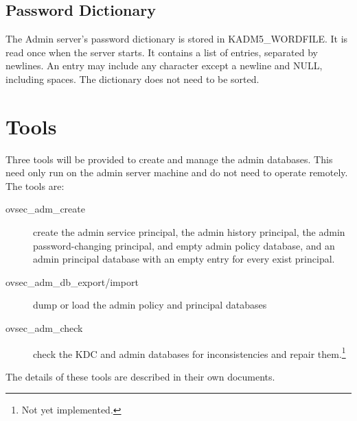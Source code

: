 \subsection{Password Dictionary}

The Admin server's password dictionary is stored in
KADM5_WORDFILE.  It is read once when the server starts.  It
contains a list of entries, separated by newlines.  An entry may
include any character except a newline and NULL, including spaces.
The dictionary does not need to be sorted.

\section{Tools}
\label{sec:tools}

Three tools will be provided to create and manage the admin databases.
This need only run on the admin server machine and do not need to
operate remotely.  The tools are:

\begin{description}
\item[ovsec_adm_create] create the admin service principal, the admin
history principal, the admin password-changing principal, and empty
admin policy database, and an admin principal database with an empty
entry for every exist principal.
\item[ovsec_adm_db_export/import] dump or load the admin policy and
principal databases
\item[ovsec_adm_check] check the KDC and admin databases for
inconsistencies and repair them.\footnote{Not yet implemented.}
\end{description}

The details of these tools are described in their own documents.


